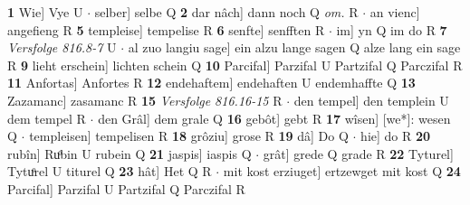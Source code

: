 \documentclass[8pt,a4paper,notitlepage]{article}
\begin{document}
\begin{table}[ht]
\begin{minipage}[t]{0.5\linewidth}
\textbf{1} Wie] Vye U  $\cdot$ selber] selbe Q \textbf{2} dar nâch] dann noch Q \textit{om.} R  $\cdot$ an vienc] angefieng R \textbf{5} templeise] tempelise R \textbf{6} senfte] senfften R  $\cdot$ im] yn Q im do R \textbf{7} \textit{Versfolge 816.8-7} U   $\cdot$ al zuo langiu sage] ein alzu lange sagen Q alze lang ein sage R \textbf{9} lieht erschein] lichten schein Q \textbf{10} Parcifal] Parzifal U Partzifal Q Parczifal R \textbf{11} Anfortas] Anfortes R \textbf{12} endehaftem] endehaften U endemhaffte Q \textbf{13} Zazamanc] zasamanc R \textbf{15} \textit{Versfolge 816.16-15} R   $\cdot$ den tempel] den templein U dem tempel R  $\cdot$ den Grâl] dem grale Q \textbf{16} gebôt] gebt R \textbf{17} wîsen] [we*]: wesen Q  $\cdot$ templeisen] tempelisen R \textbf{18} grôziu] grose R \textbf{19} dâ] Do Q  $\cdot$ hie] do R \textbf{20} rubîn] Ruͦbin U rubein Q \textbf{21} jaspis] iaspis Q  $\cdot$ grât] grede Q grade R \textbf{22} Tyturel] Tytuͦrel U titurel Q \textbf{23} hât] Het Q R  $\cdot$ mit kost erziuget] ertzewget mit kost Q \textbf{24} Parcifal] Parzifal U Partzifal Q Parczifal R \newline
\end{minipage}
\end{table}
\end{document}
